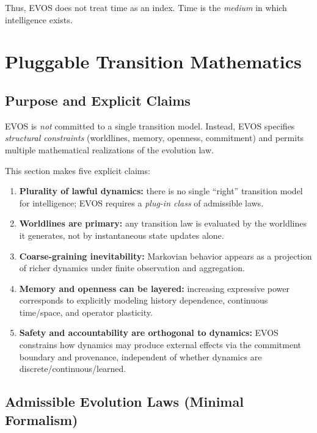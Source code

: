 \documentclass[11pt]{article}
\begin{document}
Thus, EVOS does not treat time as an index. Time is the \emph{medium} in which
intelligence exists.

\section{Pluggable Transition Mathematics}

\vspace{3mm}
\subsection{Purpose and Explicit Claims}

EVOS is \emph{not} committed to a single transition model. Instead, EVOS specifies
\emph{structural constraints} (worldlines, memory, openness, commitment) and permits
multiple mathematical realizations of the evolution law.

This section makes five explicit claims:

\begin{enumerate}
  \item \textbf{Plurality of lawful dynamics:} there is no single ``right'' transition
  model for intelligence; EVOS requires a \emph{plug-in class} of admissible laws.

  \item \textbf{Worldlines are primary:} any transition law is evaluated by the worldlines
  it generates, not by instantaneous state updates alone.

  \item \textbf{Coarse-graining inevitability:} Markovian behavior appears as a projection
  of richer dynamics under finite observation and aggregation.

  \item \textbf{Memory and openness can be layered:} increasing expressive power corresponds
  to explicitly modeling history dependence, continuous time/space, and operator plasticity.

  \item \textbf{Safety and accountability are orthogonal to dynamics:} EVOS constrains
  how dynamics may produce external effects via the commitment boundary and provenance,
  independent of whether dynamics are discrete/continuous/learned.
\end{enumerate}

\vspace{3mm}

\subsection{Admissible Evolution Laws (Minimal Formalism)}
\end{document}
